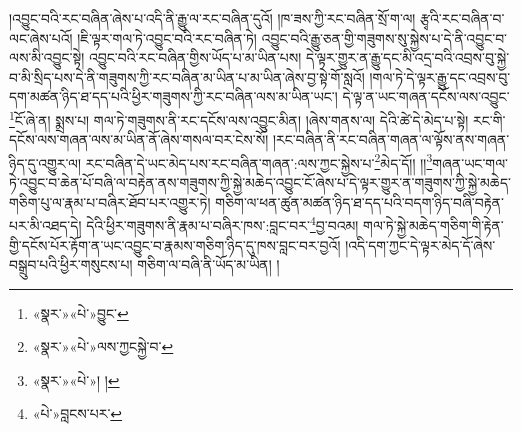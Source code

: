 །འབྱུང་བའི་རང་བཞིན་ཞེས་པ་འདི་ནི་རྒྱུ་ལ་རང་བཞིན་དུའོ། །ཁ་ཟས་ཀྱི་རང་བཞིན་སྲོ་ག་ལ། རྩྭའི་རང་བཞིན་བ་ལང་ཞེས་པའོ། །ཇི་ལྟར་གལ་ཏེ་འབྱུང་བའི་རང་བཞིན་ཏེ། འབྱུང་བའི་རྒྱུ་ཅན་གྱི་གཟུགས་སུ་སྐྱེས་པ་དེ་ནི་འབྱུང་བ་ལས་མི་འབྱུང་སྟེ། འབྱུང་བའི་རང་བཞིན་གྱིས་ཡོད་པ་མ་ཡིན་པས། དེ་ལྟར་གྱུར་ན་རྒྱུ་དང་མི་འདྲ་བའི་འབྲས་བུ་སྐྱེ་བ་མི་སྲིད་པས་དེ་ནི་གཟུགས་ཀྱི་རང་བཞིན་མ་ཡིན་པ་མ་ཡིན་ཞེས་བྱ་སྟེ་གོ་སླའོ། །གལ་ཏེ་དེ་ལྟར་རྒྱུ་དང་འབྲས་བུ་དག་མཚན་ཉིད་ཐ་དད་པའི་ཕྱིར་གཟུགས་ཀྱི་རང་བཞིན་ལས་མ་ཡིན་ཡང་། དེ་ལྟ་ན་ཡང་གཞན་དངོས་ལས་འབྱུང་\footnote{«སྣར་»«པེ་»བྱུང་}ངོ་ཞེ་ན། སྨྲས་པ། གལ་ཏེ་གཟུགས་ནི་རང་དངོས་ལས་འབྱུང་མིན། །ཞེས་གནས་ལ། དེའི་ཚེ་དེ་མེད་པ་སྟེ། རང་གི་དངོས་ལས་གཞན་ལས་མ་ཡིན་ནོ་ཞེས་གསལ་བར་ངེས་སོ། །རང་བཞིན་ནི་རང་བཞིན་གཞན་ལ་ལྟོས་ནས་གཞན་ཉིད་དུ་འགྱུར་ལ། རང་བཞིན་དེ་ཡང་མེད་པས་རང་བཞིན་གཞན་:ལས་ཀྱང་སྐྱེས་པ་\footnote{«སྣར་»«པེ་»ལས་ཀྱངསྐྱེ་བ་}མེད་དོ།། །།\footnote{«སྣར་»«པེ་»། །}གཞན་ཡང་གལ་ཏེ་འབྱུང་བ་ཆེན་པོ་བཞི་ལ་བརྟེན་ནས་གཟུགས་ཀྱི་སྐྱེ་མཆེད་འབྱུང་ངོ་ཞེས་པ་དེ་ལྟར་གྱུར་ན་གཟུགས་ཀྱི་སྐྱེ་མཆེད་གཅིག་པུ་ལ་རྣམ་པ་བཞིར་ཐོབ་པར་འགྱུར་ཏེ། གཅིག་ལ་ཕན་ཚུན་མཚན་ཉིད་ཐ་དད་པའི་བདག་ཉིད་བཞི་བརྟེན་པར་མི་འཐད་དེ། དེའི་ཕྱིར་གཟུགས་ནི་རྣམ་པ་བཞིར་ཁས་:བླང་བར་\footnote{«པེ་»བླངས་པར་}བྱ་བའམ། གལ་ཏེ་སྐྱེ་མཆེད་གཅིག་གི་རྟེན་གྱི་དངོས་པོར་རྟོག་ན་ཡང་འབྱུང་བ་རྣམས་གཅིག་ཉིད་དུ་ཁས་བླང་བར་བྱའོ། །འདི་དག་ཀྱང་དེ་ལྟར་མེད་དོ་ཞེས་བསྒྲུབ་པའི་ཕྱིར་གསུངས་པ། གཅིག་ལ་བཞི་ནི་ཡོད་མ་ཡིན། །
